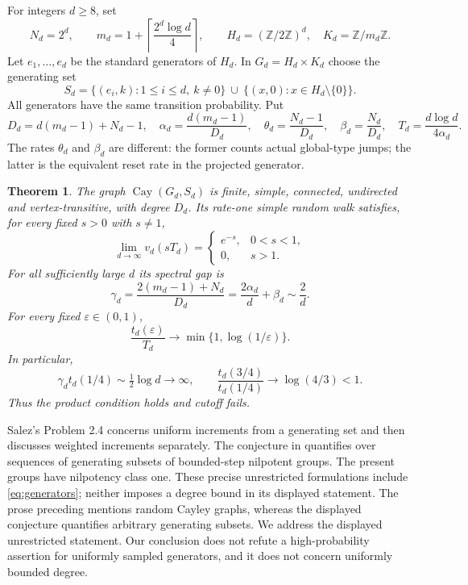 \documentclass[11pt]{article}
\newtheorem{theorem}{Theorem}[section]\newtheorem{lemma}[theorem]{Lemma}
\theoremstyle{remark}\newtheorem{remark}[theorem]{Remark}
\newcommand{\Z}{\mathbb Z}\newcommand{\Pp}{\mathbb P}\newcommand{\E}{\mathbb E}
\begin{document}
For integers $d\ge8$, set
\begin{equation}\label{eq:parameters}
 N_d=2^d,\qquad m_d=1+\left\lceil\frac{2^d\log d}{4}\right\rceil,
 \qquad H_d=(\Z/2\Z)^d,\quad K_d=\Z/m_d\Z.
\end{equation}
Let $e_1,\ldots,e_d$ be the standard generators of $H_d$. In $G_d=H_d\times K_d$ choose the generating set
\begin{equation}\label{eq:generators}
 S_d=\{(e_i,k):1\le i\le d,\ k\ne0\}
 \ \cup\ \{(x,0):x\in H_d\setminus\{0\}\}.
\end{equation}
All generators have the same transition probability. Put
\begin{equation}\label{eq:rates}
 D_d=d(m_d-1)+N_d-1,\quad
 \alpha_d=\frac{d(m_d-1)}{D_d},\quad
 \theta_d=\frac{N_d-1}{D_d},\quad
 \beta_d=\frac{N_d}{D_d},\quad
 T_d=\frac{d\log d}{4\alpha_d}.
\end{equation}
The rates $\theta_d$ and $\beta_d$ are different: the former counts actual global-type jumps; the latter is the equivalent reset rate in the projected generator.

\begin{theorem}\label{thm:main}
The graph $\operatorname{Cay}(G_d,S_d)$ is finite, simple, connected, undirected and vertex-transitive, with degree $D_d$. Its rate-one simple random walk satisfies, for every fixed $s>0$ with $s\ne1$,
\begin{equation}\label{eq:profile}
 \lim_{d\to\infty}v_d(sT_d)=
 \begin{cases} e^{-s},&0<s<1,\\0,&s>1.\end{cases}
\end{equation}
For all sufficiently large $d$ its spectral gap is
\begin{equation}\label{eq:gap}
 \gamma_d=\frac{2(m_d-1)+N_d}{D_d}
 =\frac{2\alpha_d}{d}+\beta_d\sim\frac2d.
\end{equation}
For every fixed $\varepsilon\in(0,1)$,
\begin{equation}\label{eq:mixing}
 \frac{t_d(\varepsilon)}{T_d}\longrightarrow
 \min\{1,\log(1/\varepsilon)\}.
\end{equation}
In particular,
\[
 \gamma_d t_d(1/4)\sim\tfrac12\log d\to\infty,
 \qquad \frac{t_d(3/4)}{t_d(1/4)}\longrightarrow\log(4/3)<1.
\]
Thus the product condition holds and cutoff fails.
\end{theorem}

Salez's Problem 2.4 \cite{Salez} concerns uniform increments from a generating set and then discusses weighted increments separately. The conjecture in \cite[Section 7.4, Conjecture 1]{HOT} quantifies over sequences of generating subsets of bounded-step nilpotent groups. The present groups have nilpotency class one. These precise unrestricted formulations include \eqref{eq:generators}; neither imposes a degree bound in its displayed statement. The prose preceding \cite[Conjecture 1]{HOT} mentions random Cayley graphs, whereas the displayed conjecture quantifies arbitrary generating subsets. We address the displayed unrestricted statement. Our conclusion does not refute a high-probability assertion for uniformly sampled generators, and it does not concern uniformly bounded degree.
\end{document}
